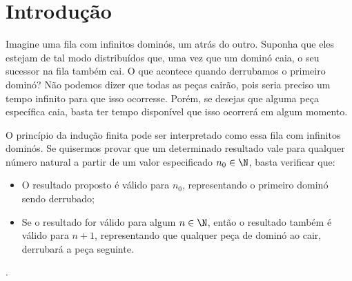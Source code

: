 \section{Introdução}

Imagine uma fila com infinitos dominós, um atrás do outro. Suponha que eles estejam de tal modo distribuídos que, uma vez que um dominó
caia, o seu sucessor na fila também cai. O que acontece quando derrubamos o primeiro dominó? Não podemos dizer que todas as peças cairão, pois seria preciso um tempo infinito para que isso ocorresse. Porém, se desejas que alguma peça específica caia, basta ter tempo disponível que isso ocorrerá em algum momento.

O princípio da indução finita pode ser interpretado como essa fila com infinitos dominós. Se quisermos provar que um determinado resultado vale para qualquer número natural a partir de um valor especificado $n_0 \in \N$, basta verificar que: 
\begin{itemize}
    \item O resultado proposto é válido para $n_0$, representando o primeiro dominó sendo derrubado;
    \item Se o resultado for válido para algum $n \in \N$, então o resultado também é válido para $n+1$, representando que qualquer peça de dominó ao cair, derrubará a peça seguinte.
\end{itemize}

\begin{tve}
	.
\end{tve}